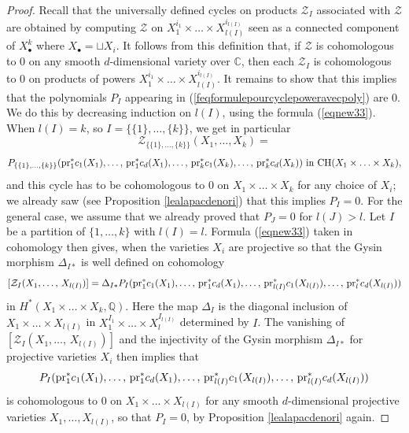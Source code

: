 \documentclass[10pt]{article}
\begin{document}
\begin{proof}
Recall that the universally defined cycles on products $\mathcal{Z}_I$ associated with $\mathcal{Z}$ are
  obtained by computing $\mathcal{Z}$ on $X_1^{i_1}\times\ldots\times X_{l(I)}^{i_{l(I)}}$ seen as a
connected component  of
$X_\bullet^k$ where $X_\bullet=\sqcup X_i$.
It follows from this definition that, if $\mathcal{Z} $   is cohomologous to $0$ on any
smooth $d$-dimensional variety over $\mathbb{C}$, then each $\mathcal{Z}_I$ is cohomologous to $0$
on products of powers $X_1^{i_1}\times\ldots\times X_{l(I)}^{i_{l(I)}}$.
It remains to show that this implies that the polynomials $P_I$ appearing in
(\ref{feqformulepourcyclepoweravecpoly}) are $0$.
We do this by decreasing induction on $l(I)$, using the  formula
(\ref{eqnew33}).
When $l(I)=k$, so $I=\{\{1\},\ldots,\{k\}\}$,
we get in particular
$$\mathcal{Z}_{\{\{1\},\ldots,\{k\}\}}(X_1,\ldots,X_k)=$$
$$P_{\{\{1\},\ldots,\{k\}\}}(
{\rm pr}_1^*c_1(X_1),\ldots,\,{\rm pr}_1^*c_d(X_1),\ldots,\,{\rm pr}_k^*c_1(X_k),\ldots,\,{\rm pr}_k^*c_d(X_k))\,\,{\rm in}\,\,{\rm CH}(X_1\times\ldots\times X_k),$$
and this cycle has to be cohomologous to $0$ on $X_1\times\ldots\times X_k$ for any choice of $X_i$; we already saw (see Proposition \ref{lealapacdenori}) that this implies $P_I=0$.
For the general case, we assume that we already proved that $P_J=0$ for $l(J)>l$. Let $I$ be a partition of $\{1,\ldots,k\}$
with $l(I)=l$.
Formula (\ref{eqnew33}) taken in cohomology then gives, when the varieties  $X_i$  are
projective so that the Gysin morphism $\Delta_{I*}$ is well defined on cohomology
$$[\mathcal{Z}_I(X_1,\ldots,\,X_{l(I)})]=\Delta_{I*}P_I({\rm pr}_1^*c_1(X_1),\ldots,\,{\rm pr}_1^*c_d(X_1),\ldots,\,{\rm pr}_{l(I)}^*c_1(X_{l(I)}),\ldots,\,{\rm pr}_l^*c_d(X_{l(I)}))$$
in $H^*(X_1\times\ldots\times X_k,\mathbb{Q})$.
Here the map $\Delta_I$  is the diagonal inclusion of $X_1\times\ldots\times X_{l(I)}$ in $X_1^{I_1}\times\ldots \times X_l^{I_{l(I)}}$ determined by $I$.
The vanishing of $[\mathcal{Z}_I(X_1,\ldots,\,X_{l(I)})]$ and the injectivity of the Gysin morphism
$\Delta_{I*}$ for projective varieties  $X_i$  then implies that $$P_I({\rm pr}_1^*c_1(X_1),\ldots,\,{\rm pr}_1^*c_d(X_1),\ldots,\,{\rm pr}_{l(I)}^*c_1(X_{l(I)}),\ldots,\,{\rm pr}_{l(I)}^*c_d(X_{l(I)}))$$ is cohomologous to  $0$ on
$X_1\times \ldots \times X_{l(I)}$ for any smooth $d$-dimensional  projective varieties $X_1,\ldots, X_{l(I)}$, so that $P_I=0$, by Proposition \ref{lealapacdenori} again.
 \end{proof}
\end{document}
